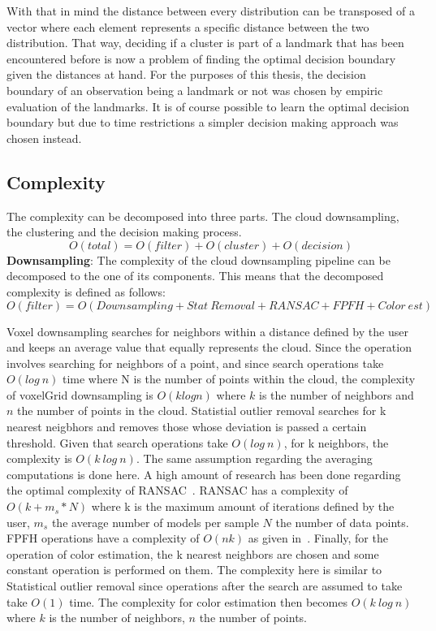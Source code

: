 \documentclass[twoside,hidelinks]{article}
\begin{document}
With that in mind the distance between every distribution can be transposed of a vector where each element represents a specific distance between the two distribution. That way, deciding if a cluster is part of a landmark that has been encountered before is now a problem of finding the optimal decision boundary given the distances at hand. For the purposes of this thesis, the decision boundary of an observation being a landmark or not was chosen by empiric evaluation of the landmarks. It is of course possible to learn the optimal decision boundary but due to time restrictions a simpler decision making approach was chosen instead.

\subsection{Complexity}

The complexity can be decomposed into three parts. The cloud downsampling, the clustering and the decision making process.
$$
O(total) = O(filter) + O(cluster) + O(decision)
$$
\textbf{Downsampling}: The complexity of the cloud downsampling pipeline can be decomposed to the one of its components. This means that the decomposed complexity is defined as follows:
$$O(filter) = O(Downsampling + Stat\ Removal + RANSAC+ FPFH + Color\ est) $$

Voxel downsampling searches for neighbors within a distance defined by the user and keeps an average value that equally represents the cloud. Since the operation involves searching for neighbors of a point, and since search operations take $O(log\ n)$ time where N is the number of points within the cloud, the complexity of voxelGrid downsampling is $O(k log n)$ where $k$ is the number of neighbors and $n$ the number of points in the cloud. 
Statistial outlier removal searches for k nearest neigbhors and removes those whose deviation is passed a certain threshold. Given that search operations take $O(log\ n)$, for k neighbors, the complexity is $O(k\ log\ n)$. The same assumption regarding the averaging computations is done here.
A high amount of research has been done regarding the optimal complexity of RANSAC~\cite{RANSAC}. RANSAC has a complexity of $ O(k+ m_s*N)$ where k is the maximum amount of iterations defined by the user, $m_s$ the average number of models per sample $N$ the number of data points.
FPFH operations have a complexity of $O(nk)$ as given in~\cite{fpfh}.
Finally, for the operation of color estimation, the k nearest neighbors are chosen and some constant operation is performed on them. The complexity here is similar to Statistical outlier removal since operations after the search are assumed to take take $O(1)$ time. The complexity for color estimation then becomes $O(k\ log\ n)$ where $k$ is the number of neighbors, $n$ the number of points. 
\end{document}
